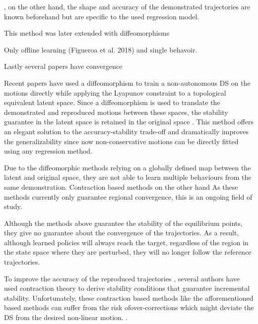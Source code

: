 \cite{neumannNeuralLearningStable2013,lemmeNeuralLearningVector2014,tesfazgiInverseReinforcementLearning2021,coulombeGeneratingStableCollisionFree2022}, on the other hand, the shape and accuracy of the demonstrated trajectories are known beforehand but are specific to the used regression model.


This method was later extended with diffeomorphisms 

Only offline learning (Figueroa et al. 2018) and single behavoir.



Lastly several papers have convergence



Recent papers have used a diffeomorphism to train a non-autonomous DS on the motions directly while applying the Lyapunov constraint to a topological equivalent latent space. Since a diffeomorphism is used to translate the demonstrated and reproduced motions between these spaces, the stability guarantee in the latent space is retained in the original space \cite{leeIntroductionTopologicalManifolds2011,leeIntroductionSmoothManifolds2012,leeIntroductionRiemannianManifolds2018}. This method offers an elegant solution to the accuracy-stability trade-off and dramatically improves the generalizability since now non-conservative motions can be directly fitted using any regression method. 

Due to the diffeomorphic methods relying on a globally defined map between the latent and original space, they are not able to learn multiple behaviours from the same demonstration. Contraction based methods on the other hand As these methods currently only guarantee regional convergence, this is an ongoing field of study.

Although the methods above guarantee the stability of the equilibrium points, they give no guarantee about the convergence of the trajectories. As a result, although learned policies will always reach the target, regardless of the region in the state space where they are perturbed, they will no longer follow the reference trajectories. 

To improve the accuracy of the reproduced trajectories \cite{blocherLearningStableDynamical2017}, several authors have used contraction theory to derive stability conditions that guarantee incremental stability. Unfortunately, these contraction based methods like the afforementioned based methods can suffer from the risk ofover-corrections which might deviate the DS from the desired non-linear motion. \cite{figueroafernandezPhysicallyconsistentBayesianNonparametric2018}. 

